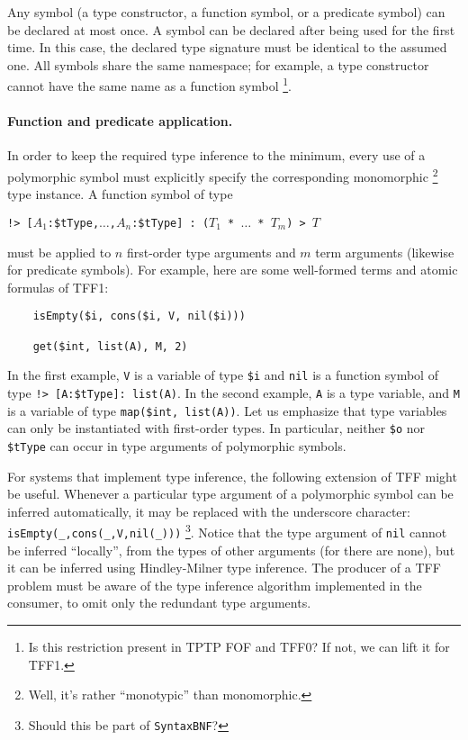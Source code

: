 Any symbol (a type constructor, a function symbol, or a predicate symbol)
can be declared at most once. A symbol can be declared after being used
for the first time. In this case, the declared type signature must be
identical to the assumed one. All symbols share the same namespace; for
example, a type constructor cannot have the same name as a function symbol%
\footnote{Is this restriction present in TPTP FOF and TFF0? If not, we can
lift it for TFF1.}.

\paragraph{Function and predicate application.} In order to keep
the required type inference to the minimum, every use of a polymorphic
symbol must explicitly specify the corresponding monomorphic%
\footnote{Well, it's rather ``monotypic'' than monomorphic.}
type instance.
A function symbol of type
\begin{center}
{\tt !>~[$A_1$:\$tType,$\dots$,$A_n$:\$tType]~:~($T_1$ * $\dots$ * $T_m$)
> $T$}
\end{center}
must be applied to $n$ first-order type arguments and $m$ term arguments
(likewise for predicate symbols). For example, here are some well-formed
terms and atomic formulas of TFF1:
\begin{verbatim}
    isEmpty($i, cons($i, V, nil($i)))

    get($int, list(A), M, 2)
\end{verbatim}
In the first example, {\tt V} is a variable of type {\tt \$i}
and {\tt nil} is a function
symbol of type {\tt !>~[A:\$tType]: list(A)}. In the second
example, {\tt A} is a type variable, and {\tt M} is a variable
of type {\tt map(\$int, list(A))}. Let us emphasize that type
variables can only be instantiated with first-order types.
In particular, neither \verb+$o+ nor \verb+$tType+ can occur
in type arguments of polymorphic symbols.

For systems that implement type inference, the following extension
of TFF might be useful. Whenever a particular type argument of
a polymorphic symbol can be inferred automatically, it may be
replaced with
the underscore character: \verb+isEmpty(_,cons(_,V,nil(_)))+%
\footnote{Should this be part of {\tt SyntaxBNF}?}.
Notice that the type argument of {\tt nil} cannot be inferred
``locally'', from the types of other arguments (for there are none),
but it can be inferred using Hindley-Milner type inference.
The producer of a TFF problem must be aware of the type
inference algorithm implemented in the consumer, to omit
only the redundant type arguments.


